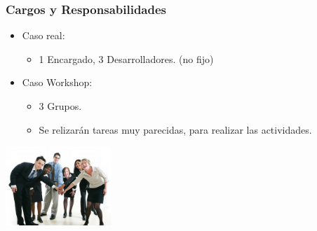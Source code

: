 \begin{frame}
\frametitle{Cargos y Responsabilidades}
\begin{itemize}
    \item Caso real:
	 \begin{itemize}
	 	\item 1 Encargado, 3 Desarrolladores. (no fijo)
	 \end{itemize}
	\item Caso Workshop:
	\begin{itemize}
		\item 3 Grupos.
		\item Se relizarán tareas muy parecidas, para realizar las actividades.
	\end{itemize}
\end{itemize}
\begin{center}
	\includegraphics[width=0.3\textwidth]{img/equipo}
\end{center}
\end{frame}

